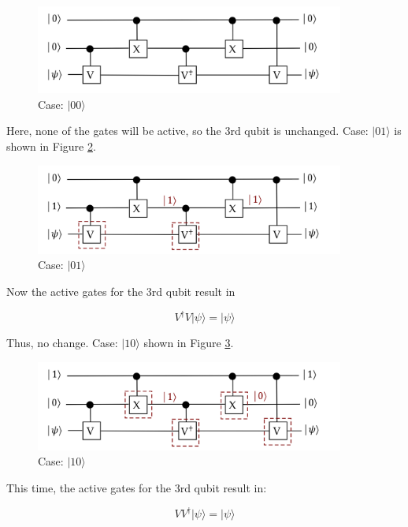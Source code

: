 \documentclass[main.tex]{subfiles}
\begin{document}
    \begin{figure}
        \centering
        \includegraphics[width=4in]{notes/figs/n09/12ccu2.png}
        \caption{Case: $|00\rangle$}
        \label{fig:12ccu2}
    \end{figure}
    
    Here, none of the gates will be active, so the 3rd qubit is unchanged. Case: $|01\rangle$ is shown in Figure \ref{fig:13ccu3}.
    
    \begin{figure}
        \centering
        \includegraphics[width=4in]{notes/figs/n09/13ccu3.png}
        \caption{Case: $|01\rangle$}
        \label{fig:13ccu3}
    \end{figure}
    
    Now the active gates for the 3rd qubit result in
    
    $$
    V^{\dagger} V|\psi\rangle=|\psi\rangle
    $$
    
    Thus, no change. Case: $|10\rangle$ shown in Figure \ref{fig:14ccu4}.
    
    \begin{figure}
        \centering
        \includegraphics[width=4in]{notes/figs/n09/14ccu4.png}
        \caption{Case: $|10\rangle$}
        \label{fig:14ccu4}
    \end{figure}

    This time, the active gates for the 3rd qubit result in:
    
    $$
    V V^{\dagger}|\psi\rangle=|\psi\rangle
    $$
\end{document}

